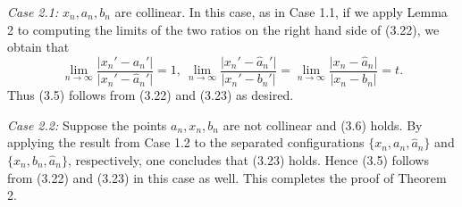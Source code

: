 \documentclass[11pt]{amsart}
\numberwithin{equation}{section}
\theoremstyle{plain}
\theoremstyle{step}
\newenvironment{case}[1]{\par\noindent\textit{Case #1:}}{\par}
\newcommand{\abs}[1]{\lvert#1\rvert}
\newcommand{\anr}{\hat{a}_n}
\begin{document}
\vspace{0.3cm}
\begin{case}{2.1} $x_n,a_n,b_n$ are collinear. 
In this case, as in Case 1.1, if we apply Lemma 2 to computing the limits of the two ratios on the right hand side of (3.22), we obtain that
\begin{equation}
   \lim_{n\rightarrow\infty}\frac{\abs{x_n'-a_n'}}{\abs{x_n'-\anr'}}
   =1, \ 
\lim_{n\rightarrow\infty}\frac{\abs{x_n'-\anr'}}{\abs{x_n'-b_n'}}=\lim_{n\rightarrow\infty}\frac{\abs{x_n-\anr}}{\abs{x_n-b_n}}=t. 
\end{equation}
Thus (3.5) follows from (3.22) and (3.23) as desired.


\end{case}
\vspace{0.3cm}
\begin{case}{2.2} Suppose the points $a_n,x_n,b_n$ are not collinear and (3.6) holds. By applying the result from Case 1.2 to the separated configurations $\{x_n, a_n, \anr\}$ and $\{x_n, b_n, \anr\}$, respectively, one concludes that (3.23) holds. Hence (3.5) follows from (3.22) and (3.23) in this case as well.
This completes the proof of Theorem 2.
\end{case}
\end{document}
